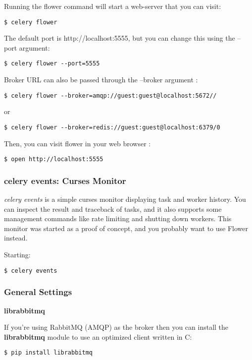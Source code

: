 \documentclass[9pt,a4paper]{article}
\begin{document}
\begin{CJK*}{GBK}{kai}
Running the flower command will start a web-server that you can visit:
\begin{Verbatim}[frame=single]
$ celery flower
\end{Verbatim}
The default port is http://localhost:5555, but you can change this using the –port argument:
\begin{Verbatim}[frame=single]
$ celery flower --port=5555
\end{Verbatim}
Broker URL can also be passed through the –broker argument :
\begin{Verbatim}[frame=single]
$ celery flower --broker=amqp://guest:guest@localhost:5672//
\end{Verbatim}
or
\begin{Verbatim}[frame=single]
$ celery flower --broker=redis://guest:guest@localhost:6379/0
\end{Verbatim}
Then, you can visit flower in your web browser :
\begin{Verbatim}[frame=single]
$ open http://localhost:5555
\end{Verbatim}

\subsubsection{celery events: Curses Monitor}
\textit{celery events} is a simple curses monitor displaying task and worker history. You can inspect the result and traceback of tasks, and it also supports some management commands like rate limiting and shutting down workers. This monitor was started as a proof of concept, and you probably want to use Flower instead.

Starting:

\begin{Verbatim}[frame=single]
$ celery events
\end{Verbatim}

\subsubsection{General Settings}

\textbf{librabbitmq}

If you’re using RabbitMQ (AMQP) as the broker then you can install the \textbf{librabbitmq} module to use an optimized client written in C:

\begin{Verbatim}[frame=single]
$ pip install librabbitmq
\end{Verbatim}


\end{CJK*}
\end{document}

